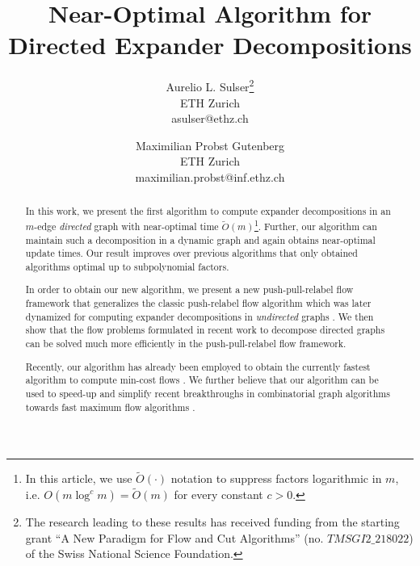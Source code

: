 \documentclass[11pt]{article}
\title{Near-Optimal Algorithm for Directed Expander Decompositions}
\date{}
\author{Aurelio L. Sulser\thanks{The research leading to these results has received funding from the starting grant “A New Paradigm for Flow and Cut Algorithms” (no. $TMSGI2\_218022$) of the Swiss National Science Foundation.} \\ ETH Zurich \\ asulser@ethz.ch \\ \and Maximilian Probst Gutenberg\samethanks \hspace{0.5em}\orcidlink{0000-0003-3522-156X}
 \\ ETH Zurich \\ maximilian.probst@inf.ethz.ch}
\begin{document}

\maketitle

\begin{abstract}







In this work, we present the first algorithm to compute expander decompositions in an $m$-edge \emph{directed} graph with near-optimal time $\tilde{O}(m)$\footnote{In this article, we use $\tilde{O}(\cdot)$ notation to suppress factors logarithmic in $m$, i.e. $O(m \log^c m) = \tilde{O}(m)$ for every constant $c > 0$.}. Further, our algorithm can maintain such a decomposition in a dynamic graph and again obtains near-optimal update times. Our result improves over previous algorithms \cite{bernstein2020deterministic, hua2023maintaining} that only obtained algorithms optimal up to subpolynomial factors.

In order to obtain our new algorithm, we present a new push-pull-relabel flow framework that generalizes the classic push-relabel flow algorithm \cite{goldberg1988new} which was later dynamized for computing expander decompositions in \emph{undirected} graphs \cite{henzinger2020local, saranurak2019expander}. We then show that the flow problems formulated in recent work \cite{hua2023maintaining} to decompose directed graphs can be solved much more efficiently in the push-pull-relabel flow framework. 

Recently, our algorithm has already been employed to obtain the currently fastest algorithm to compute min-cost flows \cite{vdB2024decrMincost}. We further believe that our algorithm can be used to speed-up and simplify recent breakthroughs in combinatorial graph algorithms towards fast maximum flow algorithms \cite{chuzhoy2024faster, chuzhoy2024maximum, bernstein2024maximum}.
\end{abstract}

\pagebreak



\pagebreak
{}
\end{document}
